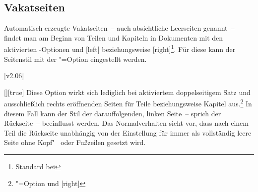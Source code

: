 \begin{Declaration*}{}
\begin{Declaration*}{}
\begin{Declaration*}{}
\subsection{Vakatseiten}
%
%
Automatisch erzeugte Vakatseiten~-- auch absichtliche Leerseiten genannt~-- 
findet man am Beginn von Teilen und Kapiteln in Dokumenten mit den aktivierten 
\KOMAScript-Optionen  und [left] beziehungsweise 
[right]\footnote{Standard bei }. Für diese kann 
der Seitenstil mit der \KOMAScript"=Option  eingestellt 
werden.

[v2.06]
\begin{Declaration}{[\PSet]}[true]%
\printdeclarationlist%
%
%
%
%
%
Diese Option wirkt sich lediglich bei aktiviertem doppelseitigem Satz und 
ausschließlich rechts eröffnenden Seiten für Teile beziehungsweise Kapitel
aus.\footnote{\KOMAScript"=Option  und [right]} 
In diesem Fall kann der Stil der darauffolgenden, linken Seite~-- sprich der 
Rückseite~-- beeinflusst werden. Das Normalverhalten sieht vor, dass nach einem 
Teil die Rückseite unabhängig von der Einstellung für  
immer als vollständig leere Seite ohne Kopf"~ oder Fußzeilen gesetzt wird.


\end{Declaration}
\end{Declaration*}
\end{Declaration*}
\end{Declaration*}
